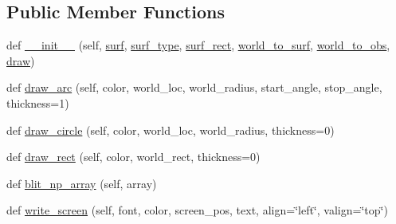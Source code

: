 \subsection*{Public Member Functions}
\begin{DoxyCompactItemize}
\item 
def \mbox{\hyperlink{classpysc2_1_1lib_1_1renderer__human_1_1___surface_a1357779bf7813158c9333300636fd107}{\+\_\+\+\_\+init\+\_\+\+\_\+}} (self, \mbox{\hyperlink{classpysc2_1_1lib_1_1renderer__human_1_1___surface_a4f0f39530a27df058f01c18e19f705f6}{surf}}, \mbox{\hyperlink{classpysc2_1_1lib_1_1renderer__human_1_1___surface_a5f951c622b86c80f949b09f274995ffe}{surf\+\_\+type}}, \mbox{\hyperlink{classpysc2_1_1lib_1_1renderer__human_1_1___surface_a3a7c29c8853fde7755b1c9908631a8b3}{surf\+\_\+rect}}, \mbox{\hyperlink{classpysc2_1_1lib_1_1renderer__human_1_1___surface_a76ded3196283f7e7104ba8f8a784c917}{world\+\_\+to\+\_\+surf}}, \mbox{\hyperlink{classpysc2_1_1lib_1_1renderer__human_1_1___surface_a7fa7b3c456fca16f552252649db7ac44}{world\+\_\+to\+\_\+obs}}, \mbox{\hyperlink{classpysc2_1_1lib_1_1renderer__human_1_1___surface_ada72ce60001e5107b602d6543007c9de}{draw}})
\item 
def \mbox{\hyperlink{classpysc2_1_1lib_1_1renderer__human_1_1___surface_a3147e67c55d537f3903e088ee03f7016}{draw\+\_\+arc}} (self, color, world\+\_\+loc, world\+\_\+radius, start\+\_\+angle, stop\+\_\+angle, thickness=1)
\item 
def \mbox{\hyperlink{classpysc2_1_1lib_1_1renderer__human_1_1___surface_a0dbda25a5a85520c8740e0d2a232848b}{draw\+\_\+circle}} (self, color, world\+\_\+loc, world\+\_\+radius, thickness=0)
\item 
def \mbox{\hyperlink{classpysc2_1_1lib_1_1renderer__human_1_1___surface_a8f798a0fa115c799ea7eeed7f0baa842}{draw\+\_\+rect}} (self, color, world\+\_\+rect, thickness=0)
\item 
def \mbox{\hyperlink{classpysc2_1_1lib_1_1renderer__human_1_1___surface_a586834302ec3b26934da8b2d5b3734f6}{blit\+\_\+np\+\_\+array}} (self, array)
\item 
def \mbox{\hyperlink{classpysc2_1_1lib_1_1renderer__human_1_1___surface_a2ff2cc7e501dfe9713ac4f7b56708a0c}{write\+\_\+screen}} (self, font, color, screen\+\_\+pos, text, align=\char`\"{}left\char`\"{}, valign=\char`\"{}top\char`\"{})
\end{DoxyCompactItemize}
